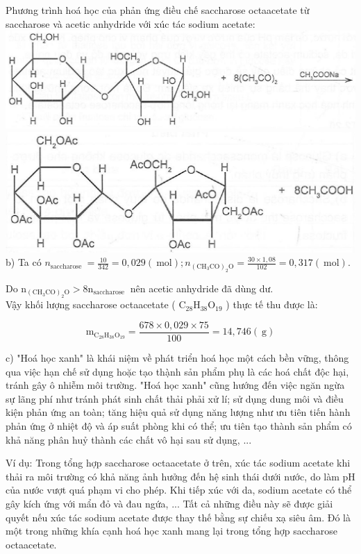 \documentclass[10pt]{article}
\begin{document}
Phương trình hoá học của phản ứng điều chế saccharose octaacetate từ saccharose và acetic anhydride với xúc tác sodium acetate:\\
\includegraphics[max width=\textwidth, center]{2025_10_23_b4e16b74380d0f7e7700g-042(1)}\\
\includegraphics[max width=\textwidth, center]{2025_10_23_b4e16b74380d0f7e7700g-042}\\
b) Ta có $n_{\text {saccharose }}=\frac{10}{342}=0,029(\mathrm{~mol}) ; n_{\left(\mathrm{CH}_{3} \mathrm{CO}\right)_{2} \mathrm{O}}=\frac{30 \times 1,08}{102}=0,317(\mathrm{~mol})$.

Do $\mathrm{n}_{\left(\mathrm{CH}_{3} \mathrm{CO}\right)_{2} \mathrm{O}}>8 \mathrm{n}_{\text {saccharose }}$ nên acetic anhydride đã dùng dư.\\
Vậy khối lượng saccharose octaacetate ( $\mathrm{C}_{28} \mathrm{H}_{38} \mathrm{O}_{19}$ ) thực tế thu được là:

$$
\mathrm{m}_{\mathrm{C}_{28} \mathrm{H}_{38} \mathrm{O}_{19}}=\frac{678 \times 0,029 \times 75}{100}=14,746(\mathrm{~g})
$$

c) "Hoá học xanh" là khái niệm về phát triển hoá học một cách bền vững, thông qua việc hạn chế sử dụng hoặc tạo thạ̀nh sản phẩm phụ là các hoá chất độc hại, tránh gây ô nhiễm môi trường. "Hoá học xanh" cũng hướng đến việc ngăn ngừa sự lãng phí như tránh phát sinh chất thải phải xử lí; sử dụng dung môi và điều kiện phản ứng an toàn; tăng hiệu quả sử dụng năng lượng như ưu tiên tiến hành phản ứng ở nhiệt độ và áp suất phòng khi có thể; ưu tiên tạo thành sản phẩm có khả năng phân huỷ thành các chất vô hại sau sử dụng, ...

Ví dụ: Trong tổng hợp saccharose octaacetate ở trên, xúc tác sodium acetate khi thải ra môi trường có khả năng ảnh hưởng đến hệ sinh thái dưới nước, do làm pH của nước vượt quá phạm vi cho phép. Khi tiếp xúc với da, sodium acetate có thể gây kích ứng với mẩn đỏ và đau ngứa, ... Tất cả những điều này sẽ được giải quyết nếu xúc tác sodium acetate được thay thế bằng sự chiếu xạ siêu âm. Đó là một trong những khía cạnh hoá học xanh mang lại trong tổng hợp saccharose octaacetate.
\end{document}
